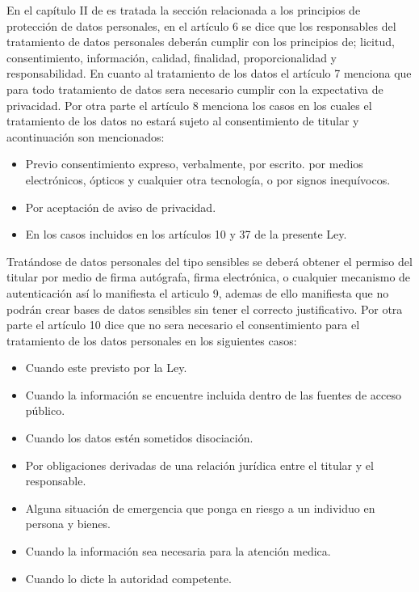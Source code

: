 \documentclass[runningheads,a4paper]{llncs}
\begin{document}
En el capítulo II de \cite{LFPDPPP_1} es tratada la sección relacionada a los principios de protección de datos personales, en el artículo 6 se dice que los responsables del tratamiento de datos personales deberán cumplir con los principios de; licitud, consentimiento, información, calidad, finalidad, proporcionalidad y responsabilidad. En cuanto al tratamiento de los datos el artículo 7 menciona que para todo tratamiento de datos sera necesario cumplir con la expectativa de privacidad. Por otra parte el artículo 8 menciona los casos en los cuales el tratamiento de los datos no estará sujeto al consentimiento de titular y acontinuación son mencionados:

\begin{itemize}
	\item Previo consentimiento expreso, verbalmente, por escrito. por medios electrónicos, ópticos y cualquier otra tecnología, o por signos inequívocos.
	\item Por aceptación de aviso de privacidad.
	\item En los casos incluidos en los artículos 10 y 37 de la presente Ley.
\end{itemize}

Tratándose de datos personales del tipo sensibles se deberá obtener el permiso del titular por medio de firma autógrafa, firma electrónica, o cualquier mecanismo de autenticación así lo manifiesta el articulo 9, ademas de ello manifiesta que no podrán crear bases de datos sensibles sin tener el correcto justificativo. Por otra parte el artículo 10 dice que no sera necesario el consentimiento para el tratamiento de los datos personales en los siguientes casos:

\begin{itemize}
	\item Cuando este previsto por la Ley.
	\item Cuando la información se encuentre incluida dentro de las fuentes de acceso público.
	\item Cuando los datos estén sometidos disociación.
	\item Por obligaciones derivadas de una relación jurídica entre el titular y el responsable.
	\item Alguna situación de emergencia que ponga en riesgo a un individuo en persona y bienes.
	\item Cuando la información sea necesaria para la atención medica.
	\item Cuando lo dicte la autoridad competente.
\end{itemize}    
  
\end{document}
